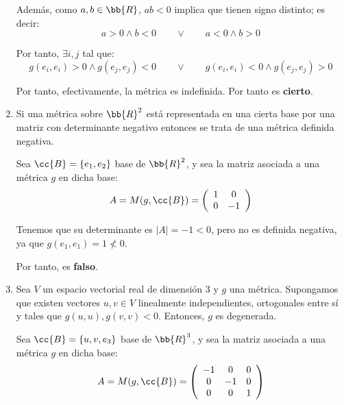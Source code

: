 \begin{ejercicio}
\begin{enumerate}
        Además, como $a,b\in \bb{R}$, $ab < 0$ implica que tienen signo distinto; es decir:
        \begin{equation*}
            a > 0 \land b<0 \qquad \lor \qquad a<0 \land b>0
        \end{equation*}

        Por tanto, $\exists i,j$ tal que:
        \begin{equation*}
            g(e_i, e_i) > 0 \land g(e_j, e_j)<0 \qquad \lor \qquad g(e_i, e_i)<0 \land g(e_j, e_j)>0
        \end{equation*}

        Por tanto, efectivamente, la métrica es indefinida. Por tanto es \textbf{cierto}.

        \item Si una métrica sobre $\bb{R}^2$ está representada en una cierta base por una matriz con determinante negativo entonces se trata de una métrica definida negativa.

        Sea $\cc{B}=\{e_1, e_2\}$ base de $\bb{R}^2$, y sea la matriz asociada a una métrica $g$ en dicha base:
        \begin{equation*}
            A = M(g, \cc{B}) = \left( \begin{array}{cc}
                1 & 0 \\
                0 & -1
            \end{array} \right)
        \end{equation*}

        Tenemos que su determinante es $|A|=-1 < 0$, pero no es definida negativa, ya que $g(e_1, e_1) = 1 \nless 0$.

        Por tanto, es \textbf{falso}.

        \item Sea $V$ un espacio vectorial real de dimensión 3 y $g$ una métrica. Supongamos que existen vectores $u,v \in V$ linealmente independientes, ortogonales entre sí y tales que $g(u,u),g(v,v) < 0$. Entonces, $g$ es degenerada.

        Sea $\cc{B}=\{u, v, e_3\}$ base de $\bb{R}^3$, y sea la matriz asociada a una métrica $g$ en dicha base:
        \begin{equation*}
            A = M(g, \cc{B}) = \left( \begin{array}{ccc}
                -1 & 0 & 0\\
                0 & -1 & 0 \\
                0 & 0 & 1    
            \end{array} \right)
        \end{equation*}


\end{enumerate}
\end{ejercicio}
